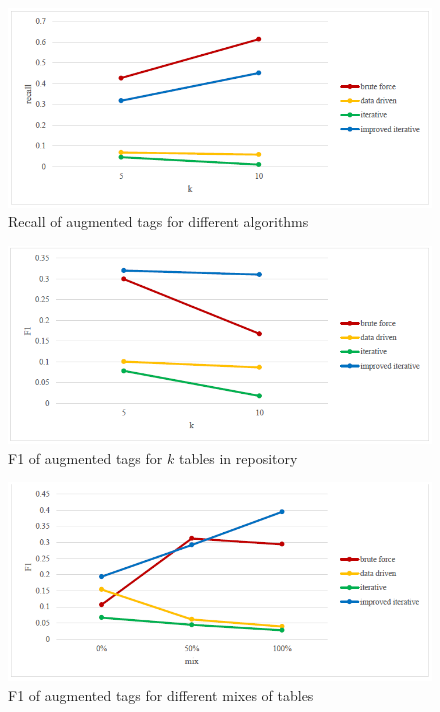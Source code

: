 \begin{figure}
    \centering
    \includegraphics[width=5in]{figures/recall-of-augmented-tags-for-different-algorithms.png}
    \caption{Recall of augmented tags for different algorithms}
    \label{fig:recall-of-augmented-tags-for-different-algorithms}
\end{figure}

\begin{figure}
    \centering
    \includegraphics[width=5in]{figures/f1-of-augmented-tags-for-k-tables-in-repository.png}
    \caption{F1 of augmented tags for $k$ tables in repository}
    \label{fig:f1-of-augmented-tags-for-k-tables-in-repository}
\end{figure}

\begin{figure}
    \centering
    \includegraphics[width=5in]{figures/f1-of-augmented-tags-for-different-mixes-of-tables.png}
    \caption{F1 of augmented tags for different mixes of tables}
    \label{fig:f1-of-augmented-tags-for-different-mixes-of-tables}
\end{figure}


